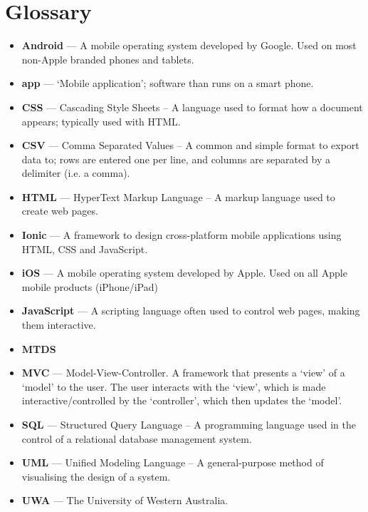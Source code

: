 \documentclass[a4paper, 11pt, titlepage]{article}
\begin{document}
\section{Glossary}
\begin{itemize}
	\item \textbf{Android} --- A mobile operating system developed by Google. Used on most non-Apple branded phones and tablets.
	\item \textbf{app} --- `Mobile application'; software than runs on a smart phone.
	\item \textbf{CSS} --- Cascading Style Sheets -- A language used to format how a document appears; typically used with HTML.
	\item \textbf{CSV} --- Comma Separated Values -- A common and simple format to export data to; rows are entered one per line, and columns are separated by a delimiter (i.e. a comma).
	\item \textbf{HTML} --- HyperText Markup Language -- A markup language used to create web pages.
	\item \textbf{Ionic} --- A framework to design cross-platform mobile applications using HTML, CSS and JavaScript.
	\item \textbf{iOS} --- A mobile operating system developed by Apple. Used on all Apple mobile products (iPhone/iPad)
	\item \textbf{JavaScript} --- A scripting language often used to control web pages, making them interactive.
	\item \textbf{MTDS}
	\item \textbf{MVC} --- Model-View-Controller. A framework that presents a `view' of a `model' to the user. The user interacts with the `view', which is made interactive/controlled by the `controller', which then updates the `model'.
	\item \textbf{SQL} --- Structured Query Language -- A programming language used in the control of a relational database management system.
	\item \textbf{UML} --- Unified Modeling Language -- A general-purpose method of visualising the design of a system.
	\item \textbf{UWA} --- The University of Western Australia.
\end{itemize}

%
%

%
\end{document}
